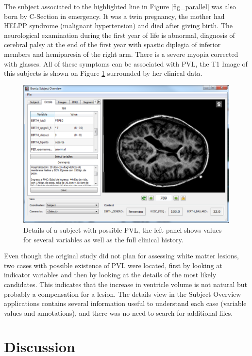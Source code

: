 \documentclass[twocolumn]{svjour3}
\begin{document}
The subject associated to the highlighted line in Figure \ref{fig_parallel} was also born by C-Section in emergency. It was a twin pregnancy, the mother had HELPP syndrome (malignant hypertension) and died after giving birth. The neurological examination during the first year of life is abnormal, diagnosis of cerebral palsy at the end of the first year with spastic diplegia of inferior members and hemiparesia of the right arm.  There is a severe myopia corrected with glasses. All of these symptoms can be associated with PVL, the T1 Image of this subjects is shown on Figure \ref{fig_subject3} surrounded by her clinical data.

\begin{figure}
\begin{center}
\includegraphics[width=\linewidth]{pvl_details}
\end{center}
 \caption{\label{fig_subject3}Details of a subject with possible PVL, the left panel shows values for several variables as well as the full clinical history.}
\end{figure}

Even though the original study did not plan for assessing white matter lesions, two cases with possible existence of PVL were located, first by looking at indicator variables and then by looking at the details of the most likely candidates. This indicates that the increase in ventricle volume is not natural but probably a compensation for a lesion. The details view in the Subject Overview applications contains several information useful to  understand each case (variable values and annotations), and there was no need to search for additional files. 

\section{Discussion}
\label{sec:disc}
\end{document}
